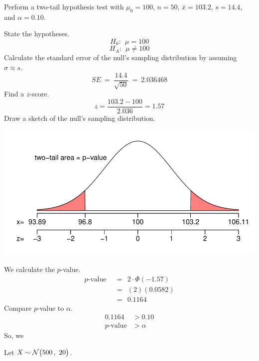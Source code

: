 \documentclass[12pt,letterpaper,addpoints]{exam}
\begin{document}
\begin{questions}
\question[10] Perform a two-tail hypothesis test with $\mu_0=100$, $n=50$, $\bar{x}=103.2$, $s=14.4$, and $\alpha=0.10$.
\begin{solution}
State the hypotheses.
$$H_0:~~ \mu=100 $$
$$H_A:~~ \mu\ne 100 $$
Calculate the standard error of the null's sampling distribution by assuming $\sigma \approx s$.
$$SE ~=~ \frac{14.4}{\sqrt{50}} ~=~ 2.036468 $$
Find a $z$-score.
$$z = \frac{103.2-100}{2.036} = 1.57 $$
Draw a sketch of the null's sampling distribution.
\begin{center}
\includegraphics[scale=1]{figures/sketch7.pdf}
\end{center}
We calculate the $p$-value.
\begin{align*}
p\text{-value} ~~&=~~ 2 \cdot \Phi(-1.57) \\
&=~~ (2)(0.0582) \\
&=~~ 0.1164
\end{align*}
Compare $p$-value to $\alpha$.
\begin{align*}
0.1164 &> 0.10 \\
p\text{-value} &> \alpha
\end{align*}
So, we 
\end{solution}



\newpage

\question[10] Let $X\sim\mathcal{N}\big(500\,,~20\big)$.
\begin{parts}

\end{parts}
\end{questions}
\end{document}
